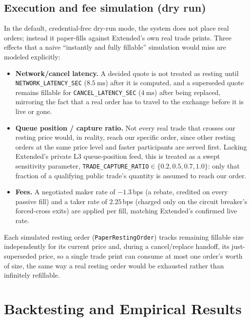 \documentclass[11pt,a4paper]{article}
\begin{document}
\subsection{Execution and fee simulation (dry run)}
\label{sec:execution-sim}

In the default, credential-free dry-run mode, the system does not place real orders; instead it
paper-fills against Extended's own real trade prints. Three effects that a naive
``instantly and fully fillable'' simulation would miss are modeled explicitly:

\begin{itemize}
  \item \textbf{Network/cancel latency.} A decided quote is not treated as resting until
        \texttt{NETWORK\_LATENCY\_SEC} ($\SI{8.5}{\milli\second}$) after it is computed, and a
        superseded quote remains fillable for \texttt{CANCEL\_LATENCY\_SEC}
        ($\SI{4}{\milli\second}$) after being replaced, mirroring the fact that a real order has
        to travel to the exchange before it is live or gone.
  \item \textbf{Queue position / capture ratio.} Not every real trade that crosses our resting
        price would, in reality, reach our specific order, since other resting orders at the
        same price level and faster participants are served first. Lacking Extended's private L3
        queue-position feed, this is treated as a swept sensitivity parameter,
        \texttt{TRADE\_CAPTURE\_RATIO}$\in\{0.2,0.5,0.7,1.0\}$: only that fraction of a
        qualifying public trade's quantity is assumed to reach our order.
  \item \textbf{Fees.} A negotiated maker rate of $-1.3$\,bps (a rebate, credited on every
        passive fill) and a taker rate of $2.25$\,bps (charged only on the circuit breaker's
        forced-cross exits) are applied per fill, matching Extended's confirmed live rate.
\end{itemize}

Each simulated resting order (\texttt{PaperRestingOrder}) tracks remaining fillable size
independently for its current price and, during a cancel/replace handoff, its just-superseded
price, so a single trade print can consume at most one order's worth of size, the same way a real
resting order would be exhausted rather than infinitely refillable.

\section{Backtesting and Empirical Results}
\label{sec:results}
\end{document}
